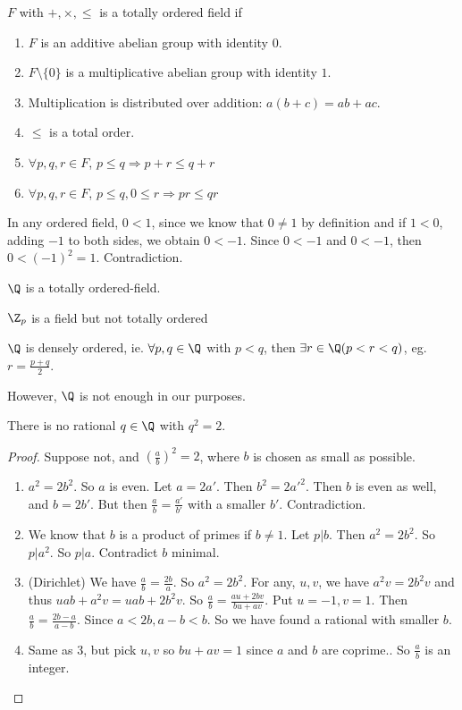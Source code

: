 \documentclass[a4paper]{article}
\begin{document}
  \begin{defi}
    $F$ with $+, \times, \leq$ is a totally ordered field if
    \begin{enumerate}
      \item $F$ is an additive abelian group with identity $0$.
      \item $F\setminus \{0\}$ is a multiplicative abelian group with identity $1$.
      \item Multiplication is distributed over addition: $a(b + c) = ab + ac$.
      \item $\leq$ is a total order.
      \item $\forall p, q, r\in F$, $p \leq q\Rightarrow p + r \leq q+ r$
      \item $\forall p, q, r\in F$, $p \leq q, 0 \leq r\Rightarrow pr \leq qr$
    \end{enumerate}

    \note In any ordered field, $0 < 1$, since we know that $0 \not= 1$ by definition and if $1 < 0$, adding $-1$ to both sides, we obtain $0 < -1$. Since $0 < -1$ and $0 < -1$, then $0 < (-1)^2 = 1$. Contradiction.
  \end{defi}
  \begin{prop}
    $\Q$ is a totally ordered-field.
  \end{prop}

  \note $\Z_p$ is a field but not totally ordered

  \begin{prop}
    $\Q$ is densely ordered, ie. $\forall p, q\in \Q$ with $p < q$, then $\exists r \in \Q( p < r < q)$, eg. $r = \frac{p + q}{2}$.
  \end{prop}
  However, $\Q$ is not enough in our purposes. 
  \begin{prop}
    There is no rational $q\in \Q$ with $q^2 = 2$. 
  \end{prop}

  \begin{proof}
    Suppose not, and $(\frac{a}{b})^2 = 2$, where $b$ is chosen as small as possible.

    \begin{enumerate}
      \item $a^2 = 2b^2$. So $a$ is even. Let $a = 2a'$. Then $b^2 = 2a'^2$. Then $b$ is even as well, and $b = 2b'$. But then $\frac{a}{b} = \frac{a'}{b'}$ with a smaller $b'$. Contradiction.
      \item We know that $b$ is a product of primes if $b \not= 1$. Let $p | b$. Then $a^2 = 2b^2$. So $p | a^2$. So $p | a$. Contradict $b$ minimal.
      \item (Dirichlet) We have $\frac{a}{b} = \frac{2b}{a}$. So $a^2 = 2b^2$. For any, $u, v$, we have $a^2v = 2b^2v$ and thus $uab + a^2v = uab + 2b^2v$. So $\frac{a}{b} = \frac{au + 2bv}{bu + av}$. Put $u = -1, v = 1$. Then $\frac{a}{b} = \frac{2b - a}{a - b}$. Since $a < 2b, a - b < b$. So we have found a rational with smaller $b$.
      \item Same as 3, but pick $u, v$ so $bu + av = 1$ since $a$ and $b$ are coprime.. So $\frac{a}{b}$ is an integer. 
    \end{enumerate}
  \end{proof}
\end{document}
